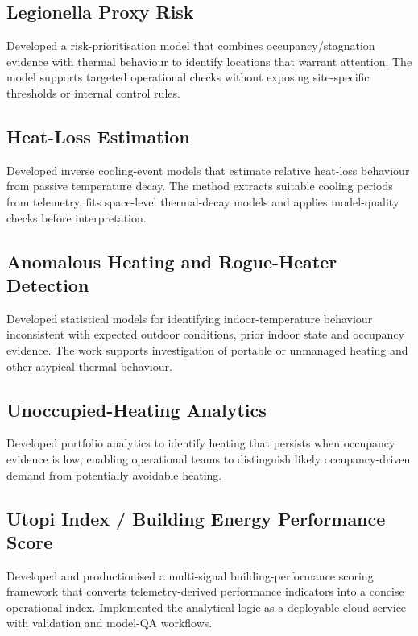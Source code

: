 \documentclass[10pt,a4paper]{article}
\begin{document}
\subsection{Legionella Proxy Risk}
Developed a risk-prioritisation model that combines occupancy/stagnation evidence with thermal behaviour to identify locations that warrant attention. The model supports targeted operational checks without exposing site-specific thresholds or internal control rules.

\subsection{Heat-Loss Estimation}
Developed inverse cooling-event models that estimate relative heat-loss behaviour from passive temperature decay. The method extracts suitable cooling periods from telemetry, fits space-level thermal-decay models and applies model-quality checks before interpretation.

\subsection{Anomalous Heating and Rogue-Heater Detection}
Developed statistical models for identifying indoor-temperature behaviour inconsistent with expected outdoor conditions, prior indoor state and occupancy evidence. The work supports investigation of portable or unmanaged heating and other atypical thermal behaviour.

\subsection{Unoccupied-Heating Analytics}
Developed portfolio analytics to identify heating that persists when occupancy evidence is low, enabling operational teams to distinguish likely occupancy-driven demand from potentially avoidable heating.

\subsection{Utopi Index / Building Energy Performance Score}
Developed and productionised a multi-signal building-performance scoring framework that converts telemetry-derived performance indicators into a concise operational index. Implemented the analytical logic as a deployable cloud service with validation and model-QA workflows.
\end{document}
